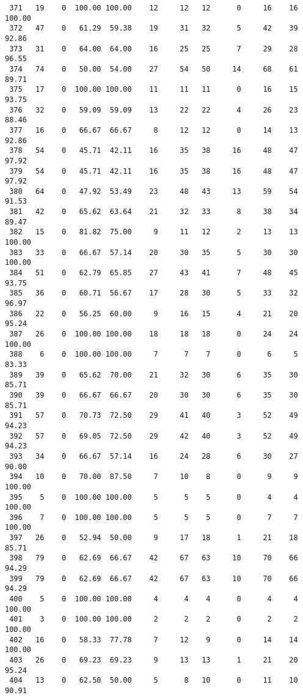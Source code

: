 \begin{verbatim}
 371   19    0  100.00 100.00    12     12   12      0     16    16   100.00
 372   47    0   61.29  59.38    19     31   32      5     42    39    92.86
 373   31    0   64.00  64.00    16     25   25      7     29    28    96.55
 374   74    0   50.00  54.00    27     54   50     14     68    61    89.71
 375   17    0  100.00 100.00    11     11   11      0     16    15    93.75
 376   32    0   59.09  59.09    13     22   22      4     26    23    88.46
 377   16    0   66.67  66.67     8     12   12      0     14    13    92.86
 378   54    0   45.71  42.11    16     35   38     16     48    47    97.92
 379   54    0   45.71  42.11    16     35   38     16     48    47    97.92
 380   64    0   47.92  53.49    23     48   43     13     59    54    91.53
 381   42    0   65.62  63.64    21     32   33      8     38    34    89.47
 382   15    0   81.82  75.00     9     11   12      2     13    13   100.00
 383   33    0   66.67  57.14    20     30   35      5     30    30   100.00
 384   51    0   62.79  65.85    27     43   41      7     48    45    93.75
 385   36    0   60.71  56.67    17     28   30      5     33    32    96.97
 386   22    0   56.25  60.00     9     16   15      4     21    20    95.24
 387   26    0  100.00 100.00    18     18   18      0     24    24   100.00
 388    6    0  100.00 100.00     7      7    7      0      6     5    83.33
 389   39    0   65.62  70.00    21     32   30      6     35    30    85.71
 390   39    0   66.67  66.67    20     30   30      6     35    30    85.71
 391   57    0   70.73  72.50    29     41   40      3     52    49    94.23
 392   57    0   69.05  72.50    29     42   40      3     52    49    94.23
 393   34    0   66.67  57.14    16     24   28      6     30    27    90.00
 394   10    0   70.00  87.50     7     10    8      0      9     9   100.00
 395    5    0  100.00 100.00     5      5    5      0      4     4   100.00
 396    7    0  100.00 100.00     5      5    5      0      7     7   100.00
 397   26    0   52.94  50.00     9     17   18      1     21    18    85.71
 398   79    0   62.69  66.67    42     67   63     10     70    66    94.29
 399   79    0   62.69  66.67    42     67   63     10     70    66    94.29
 400    5    0  100.00 100.00     4      4    4      0      4     4   100.00
 401    3    0  100.00 100.00     2      2    2      0      2     2   100.00
 402   16    0   58.33  77.78     7     12    9      0     14    14   100.00
 403   26    0   69.23  69.23     9     13   13      1     21    20    95.24
 404   13    0   62.50  50.00     5      8   10      0     11    10    90.91

\end{verbatim}
